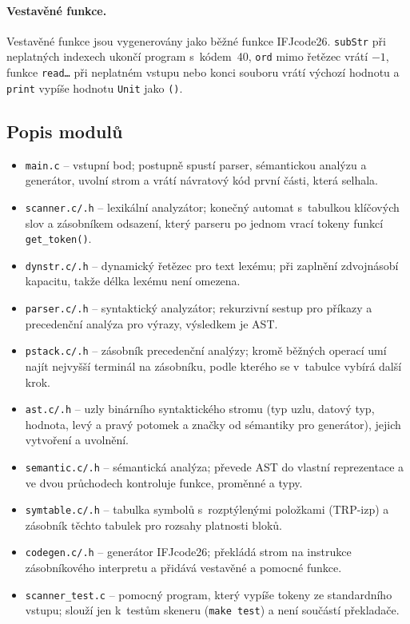 \documentclass[11pt,a4paper]{article}
\begin{document}
\paragraph{Vestavěné funkce.}
Vestavěné funkce jsou vygenerovány jako běžné funkce IFJcode26.
\texttt{subStr} při neplatných indexech ukončí program s~kódem~40,
\texttt{ord} mimo řetězec vrátí $-1$, funkce \texttt{read\dots} při
neplatném vstupu nebo konci souboru vrátí výchozí hodnotu a
\texttt{print} vypíše hodnotu \texttt{Unit} jako \texttt{()}.

\subsection{Popis modulů}
\begin{itemize}
  \item \texttt{main.c} -- vstupní bod; postupně spustí parser,
        sémantickou analýzu a generátor, uvolní strom a vrátí návratový
        kód první části, která selhala.
  \item \texttt{scanner.c/.h} -- lexikální analyzátor; konečný automat
        s~tabulkou klíčových slov a zásobníkem odsazení, který parseru po
        jednom vrací tokeny funkcí \texttt{get\_token()}.
  \item \texttt{dynstr.c/.h} -- dynamický řetězec pro text lexému;
        při zaplnění zdvojnásobí kapacitu, takže délka lexému není
        omezena.
  \item \texttt{parser.c/.h} -- syntaktický analyzátor; rekurzivní sestup
        pro příkazy a precedenční analýza pro výrazy, výsledkem je AST.
  \item \texttt{pstack.c/.h} -- zásobník precedenční analýzy; kromě
        běžných operací umí najít nejvyšší terminál na zásobníku, podle
        kterého se v~tabulce vybírá další krok.
  \item \texttt{ast.c/.h} -- uzly binárního syntaktického stromu
        (typ uzlu, datový typ, hodnota, levý a pravý potomek a značky od
        sémantiky pro generátor), jejich vytvoření a uvolnění.
  \item \texttt{semantic.c/.h} -- sémantická analýza; převede AST do
        vlastní reprezentace a ve dvou průchodech kontroluje funkce,
        proměnné a typy.
  \item \texttt{symtable.c/.h} -- tabulka symbolů s~rozptýlenými
        položkami (TRP-izp) a zásobník těchto tabulek pro rozsahy
        platnosti bloků.
  \item \texttt{codegen.c/.h} -- generátor IFJcode26; překládá strom na
        instrukce zásobníkového interpretu a přidává vestavěné a pomocné
        funkce.
  \item \texttt{scanner\_test.c} -- pomocný program, který vypíše tokeny
        ze standardního vstupu; slouží jen k~testům skeneru
        (\texttt{make test}) a není součástí překladače.
\end{itemize}
\end{document}
